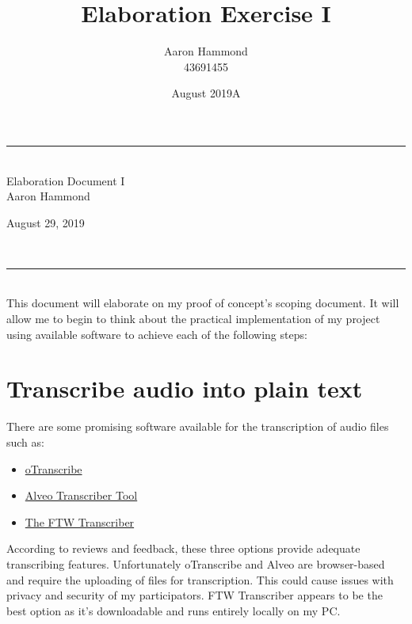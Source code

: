 \documentclass{article}
\title{Elaboration Exercise I}
\author{Aaron Hammond\\43691455}
\date{August 2019}
\newcommand\HRule{\rule{\textwidth}{1pt}} %
\begin{document}

\begin{titlepage}


\begin{center}
\HRule\\[0.4cm]
\huge{Elaboration Document I}\\[0.5cm]
\huge{Aaron Hammond}\\
\large{\date AAugust 29, 2019}\\[0.4cm]

\HRule \\[1cm]


\noindent This document will elaborate on my proof of concept's scoping document. It will allow me to begin to think about the practical implementation of my project using available software to achieve each  of the following steps:
\end{center}

\def\contentsname{\empty} %
\tableofcontents

\end{titlepage}


\section{Transcribe audio into plain text}
There are some promising software available for the transcription of audio files such as:
\begin{itemize}
    \item \href{https://otranscribe.com/}{oTranscribe}
    \item \href{https://alveo.github.io/alveo-transcriber/welcome}{Alveo Transcriber Tool}
    \item \href{https://www.theftwtranscriber.com/}{The FTW Transcriber}
\end{itemize}
According to reviews and feedback, these three options provide adequate transcribing features. Unfortunately oTranscribe and Alveo are browser-based and require the uploading of files for transcription. This could cause issues with privacy and security of my participators. FTW Transcriber appears to be the best option as it's downloadable and runs entirely locally on my PC.
\end{document}
